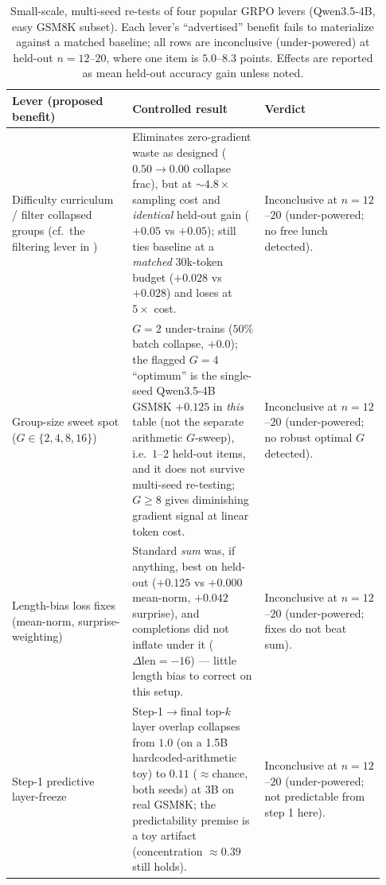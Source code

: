 \begin{table}[t]
  \centering
  \small
  \caption{Small-scale, multi-seed re-tests of four popular GRPO levers
  (Qwen3.5-4B, easy GSM8K subset). Each lever's ``advertised'' benefit
  fails to materialize against a matched baseline; all rows are
  inconclusive (under-powered) at held-out $n{=}12$--$20$, where one
  item is $5.0$--$8.3$ points. Effects are reported as
  mean held-out accuracy gain unless noted.}
  \label{tab:smallscale-nulls}
  \begin{tabular}{@{}p{0.30\linewidth}p{0.33\linewidth}p{0.30\linewidth}@{}}
    \toprule
    \textbf{Lever (proposed benefit)} & \textbf{Controlled result} & \textbf{Verdict} \\
    \midrule
    Difficulty curriculum / filter collapsed groups
      (cf.\ the filtering lever in \citep{yu2025dapo})
      & Eliminates zero-gradient waste as designed ($0.50{\to}0.00$
        collapse frac), but at ${\sim}4.8\times$ sampling cost and
        \emph{identical} held-out gain ($+0.05$ vs $+0.05$); still ties
        baseline at a \emph{matched} $30$k-token budget ($+0.028$ vs
        $+0.028$) and loses at $5\times$ cost.
      & Inconclusive at $n{=}12$--$20$ (under-powered; no free lunch detected). \\
    \addlinespace
    Group-size sweet spot ($G\in\{2,4,8,16\}$)
      & $G{=}2$ under-trains ($50\%$ batch collapse, $+0.0$); the
        flagged $G{=}4$ ``optimum'' is the single-seed Qwen3.5-4B
        GSM8K $+0.125$ in \emph{this} table (not the separate
        arithmetic $G$-sweep), i.e.\ $1$--$2$ held-out items, and it
        does not survive multi-seed re-testing; $G{\geq}8$ gives
        diminishing gradient signal at linear token cost.
      & Inconclusive at $n{=}12$--$20$ (under-powered; no robust optimal $G$ detected). \\
    \addlinespace
    Length-bias loss fixes (mean-norm, surprise-weighting)
      & Standard \emph{sum} was, if anything, best on held-out ($+0.125$
        vs $+0.000$ mean-norm, $+0.042$ surprise), and completions did
        not inflate under it ($\Delta\text{len}{=}-16$) --- little
        length bias to correct on this setup.
      & Inconclusive at $n{=}12$--$20$ (under-powered; fixes do not beat sum). \\
    \addlinespace
    Step-1 predictive layer-freeze
      & Step-1$\to$final top-$k$ layer overlap collapses from $1.0$ (on
        a 1.5B hardcoded-arithmetic toy) to $0.11$ ($\approx$chance,
        both seeds) at 3B on real GSM8K; the predictability premise is a
        toy artifact (concentration $\approx0.39$ still holds).
      & Inconclusive at $n{=}12$--$20$ (under-powered; not predictable from step 1 here). \\
    \bottomrule
  \end{tabular}
\end{table}

